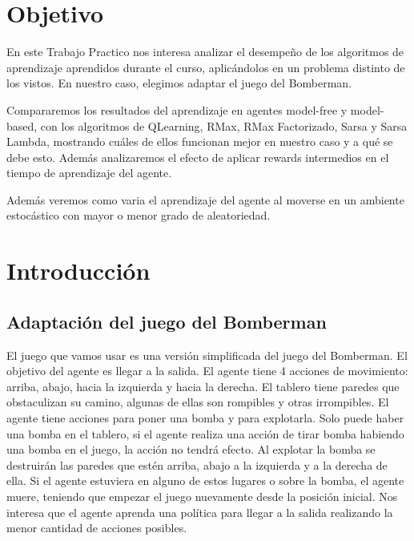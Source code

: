 \documentclass[a4paper,spanish] {article}
\begin{document}
\pagestyle{headings}



\newpage




\maketitle

\section{Objetivo}
	En  este Trabajo Practico nos interesa analizar el desempeño de los algoritmos de aprendizaje aprendidos durante el curso,  aplicándolos  en un problema distinto de los vistos. En nuestro caso, elegimos adaptar el juego del Bomberman. 
	
	Compararemos los resultados del aprendizaje en agentes model-free y model-based, con los algoritmos de QLearning, RMax, RMax Factorizado, Sarsa y Sarsa Lambda, mostrando cuáles de ellos funcionan mejor en nuestro caso y a qué se debe esto. Además analizaremos el efecto de aplicar rewards intermedios en el tiempo de aprendizaje del agente.
	
	Además veremos como varia el aprendizaje del agente al moverse en un ambiente estocástico con mayor o menor grado de aleatoriedad.

\section{Introducción}
	\subsection{Adaptación del juego del Bomberman}
	El juego que vamos usar es una versión simplificada del juego del Bomberman. El objetivo del agente es llegar a la salida. El agente tiene 4 acciones de movimiento: arriba, abajo, hacia la izquierda y hacia la derecha. El tablero tiene paredes que obstaculizan su camino, algunas de ellas son rompibles y otras irrompibles. El agente tiene acciones para poner una bomba y para explotarla. Solo puede haber una bomba en el tablero, si el agente realiza una acción de tirar bomba habiendo una bomba en el juego, la acción no tendrá efecto. Al explotar la bomba se destruirán las paredes que estén arriba, abajo a la izquierda y a la derecha de ella. Si el agente estuviera en alguno de estos lugares o sobre la bomba, el agente muere, teniendo que empezar el juego nuevamente desde la posición inicial. Nos interesa que el agente aprenda una política para llegar a la salida realizando la menor cantidad de acciones posibles.
\end{document}
